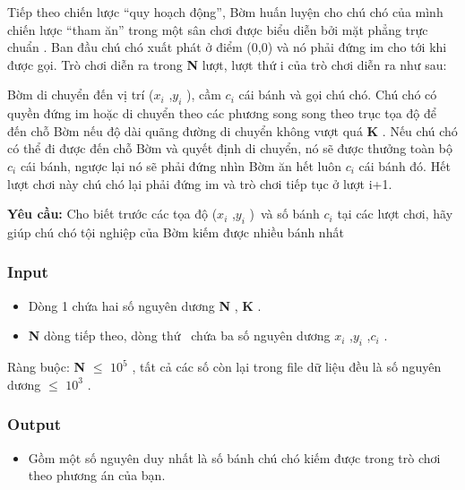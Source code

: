 



   Tiếp theo chiến lược “quy hoạch động”, Bờm huấn luyện cho chú chó của mình chiến lược “tham ăn” trong một sân chơi được biểu diễn bởi mặt phẳng trực chuẩn                                                   . Ban đầu chú chó xuất phát ở điểm (0,0) và nó phải đứng im cho tới khi được gọi. Trò chơi diễn ra trong   \textbf{    N   }   lượt, lượt thứ   i   của trò chơi diễn ra như sau:  

   Bờm di chuyển đến vị trí ($x_{i}$   ,$y_{i}$   ), cầm $c_{i}$   cái bánh và gọi chú chó. Chú chó có quyền đứng im hoặc di chuyển theo các phương song song theo trục tọa độ để đến chỗ Bờm nếu độ dài quãng đường di chuyển không vượt quá   \textbf{    K   }   . Nếu chú chó có thể đi được đến chỗ Bờm và quyết định di chuyển, nó sẽ được thưởng toàn bộ $c_{i}$   cái bánh, ngược lại nó sẽ phải đứng nhìn Bờm ăn hết luôn $c_{i}$   cái bánh đó. Hết lượt chơi này chú chó lại phải đứng im và trò chơi tiếp tục ở lượt   i+1.

\textbf{    Yêu cầu:   }   Cho biết trước các tọa độ ($x_{i}$   ,$y_{i}$   ) và số bánh $c_{i}$   tại các lượt chơi, hãy giúp chú chó tội nghiệp của Bờm kiếm được nhiều bánh nhất  

\subsubsection{   Input  }
\begin{itemize}
	\item     Dòng 1 chứa hai số nguyên dương    \textbf{     N    }    ,    \textbf{     K    }    .   
	\item \textbf{     N    }    dòng tiếp theo, dòng thứ     chứa ba số nguyên dương $x_{i}$    ,$y_{i}$    ,$c_{i}$    .   
\end{itemize}

   Ràng buộc:   \textbf{    N   }    $\le$ $10^{5}$   , tất cả các số còn lại trong file dữ liệu đều là số nguyên dương  $\le$ $10^{3}$   .  

\subsubsection{   Output  }
\begin{itemize}
	\item     Gồm một số nguyên duy nhất là số bánh chú chó kiếm được trong trò chơi theo phương án của bạn.   
\end{itemize}

